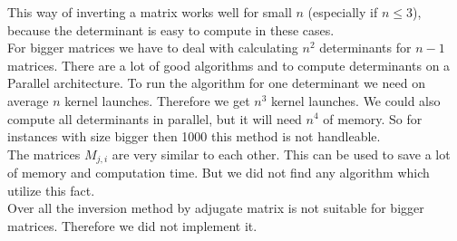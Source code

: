 This way of inverting a matrix works well for small $n$ (especially if $n \leq 3$), because the determinant is easy to compute in these cases.\\

For bigger matrices we have to deal with calculating $n^2$ determinants for $n-1$ matrices. There are a lot of good algorithms \cite{Dodgson1866} and \cite{ABDELMALEK2007} to compute determinants on a Parallel architecture. To run the algorithm for one determinant we need on average $n$ kernel launches. Therefore we get $n^3$ kernel launches. We could also compute all determinants in parallel, but it will need $n^4$ of memory. So for instances with size bigger then 1000 this method is not handleable. 
\vspace{0.3cm}\\
The matrices $M_{j,i}$ are very similar to each other. This can be used to save a lot of memory and computation time. But we did not find any algorithm which utilize this fact.
\vspace{0.3cm}\\
Over all the inversion method by adjugate matrix is not suitable for bigger matrices.  Therefore we did not implement it.
